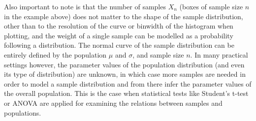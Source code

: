 \documentclass[
  12pt,
]{book}
\begin{document}
Also important to note is that the number of samples \(X_n\) (boxes of sample size \(n\) in the example above) does not matter to the shape of the sample distribution, other than to the resolution of the curve or binwidth of the histogram when plotting, and the weight of a single sample can be modelled as a probability following a distribution. The normal curve of the sample distribution can be entirely defined by the population \(\mu\) and \(\sigma\), and sample size \(n\). In many practical settings however, the parameter values of the population distribution (and even its type of distribution) are unknown, in which case more samples are needed in order to model a sample distribution and from there infer the parameter values of the overall population. This is the case when statistical tests like Student's t-test or ANOVA are applied for examining the relations between samples and populations.
\end{document}
